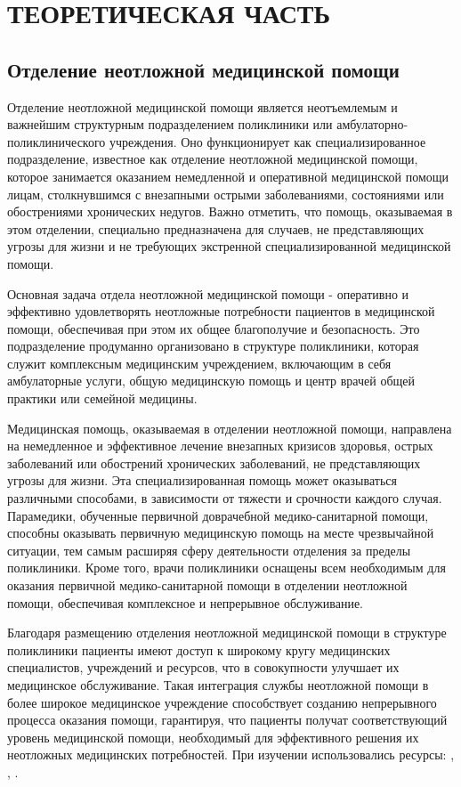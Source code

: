 \section{ТЕОРЕТИЧЕСКАЯ ЧАСТЬ}
\subsection{Отделение неотложной медицинской помощи}
Отделение неотложной медицинской помощи является неотъемлемым и важнейшим структурным подразделением поликлиники или амбулаторно-поликлинического учреждения. Оно функционирует как специализированное подразделение, известное как отделение неотложной медицинской помощи, которое занимается оказанием немедленной и оперативной медицинской помощи лицам, столкнувшимся с внезапными острыми заболеваниями, состояниями или обострениями хронических недугов. Важно отметить, что помощь, оказываемая в этом отделении, специально предназначена для случаев, не представляющих угрозы для жизни и не требующих экстренной специализированной медицинской помощи.

Основная задача отдела неотложной медицинской помощи - оперативно и эффективно удовлетворять неотложные потребности пациентов в медицинской помощи, обеспечивая при этом их общее благополучие и безопасность. Это подразделение продуманно организовано в структуре поликлиники, которая служит комплексным медицинским учреждением, включающим в себя амбулаторные услуги, общую медицинскую помощь и центр врачей общей практики или семейной медицины.

Медицинская помощь, оказываемая в отделении неотложной помощи, направлена на немедленное и эффективное лечение внезапных кризисов здоровья, острых заболеваний или обострений хронических заболеваний, не представляющих угрозы для жизни. Эта специализированная помощь может оказываться различными способами, в зависимости от тяжести и срочности каждого случая. Парамедики, обученные первичной доврачебной медико-санитарной помощи, способны оказывать первичную медицинскую помощь на месте чрезвычайной ситуации, тем самым расширяя сферу деятельности отделения за пределы поликлиники. Кроме того, врачи поликлиники оснащены всем необходимым для оказания первичной медико-санитарной помощи в отделении неотложной помощи, обеспечивая комплексное и непрерывное обслуживание.

Благодаря размещению отделения неотложной медицинской помощи в структуре поликлиники пациенты имеют доступ к широкому кругу медицинских специалистов, учреждений и ресурсов, что в совокупности улучшает их медицинское обслуживание. Такая интеграция службы неотложной помощи в более широкое медицинское учреждение способствует созданию непрерывного процесса оказания помощи, гарантируя, что пациенты получат соответствующий уровень медицинской помощи, необходимый для эффективного решения их неотложных медицинских потребностей.
При изучении использовались ресурсы: \cite{11}, \cite{12},  \cite{13}.


